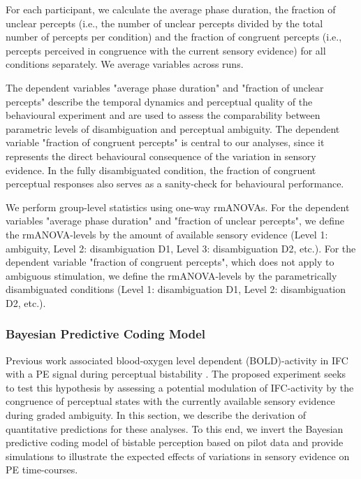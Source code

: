 \documentclass[12pt]{article}
\begin{document}
For each participant, we calculate the average phase duration, the fraction of unclear percepts (i.e., the number of unclear percepts divided by the total number of percepts per condition) and the fraction of congruent percepts (i.e., percepts perceived in congruence with the current sensory evidence) for all conditions separately. We average variables across runs. 

The dependent variables "average phase duration" and "fraction of unclear percepts" describe the temporal dynamics and perceptual quality of the behavioural experiment and are used to assess the comparability between parametric levels of disambiguation and perceptual ambiguity. The dependent variable "fraction of congruent percepts" is central to our analyses, since it represents the direct behavioural consequence of the variation in sensory evidence. In the fully disambiguated condition, the fraction of congruent perceptual responses also serves as a sanity-check for behavioural performance.

We perform group-level statistics using one-way rmANOVAs. For the dependent variables "average phase duration" and "fraction of unclear percepts", we define the rmANOVA-levels by the amount of available sensory evidence (Level 1: ambiguity, Level 2: disambiguation D1, Level 3: disambiguation D2, etc.). For the dependent variable "fraction of congruent percepts", which does not apply to ambiguous stimulation, we define the rmANOVA-levels by the parametrically disambiguated conditions (Level 1: disambiguation D1, Level 2: disambiguation D2, etc.). 

\subsubsection{Bayesian Predictive Coding Model}

Previous work associated blood-oxygen level dependent (BOLD)-activity in IFC with a PE signal during perceptual bistability \parencite{Weilnhammer2017}. The proposed experiment seeks to test this hypothesis by assessing a potential modulation of IFC-activity by the congruence of perceptual states with the currently available sensory evidence during graded ambiguity. In this section, we describe the derivation of quantitative predictions for these analyses. To this end, we invert the Bayesian predictive coding model of bistable perception \parencite{Weilnhammer2017} based on pilot data and provide simulations to illustrate the expected effects of variations in sensory evidence on PE time-courses. 
\end{document}
